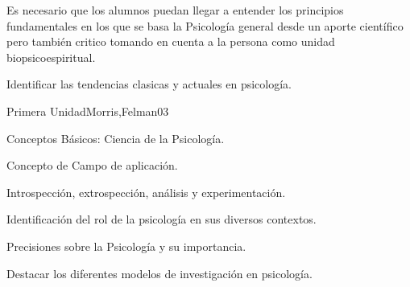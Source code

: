 \begin{syllabus}


\begin{justification}
Es necesario que los alumnos puedan llegar a entender los principios fundamentales en  los que se basa la Psicología general desde un aporte científico pero también critico tomando en cuenta a la persona como unidad biopsicoespiritual.
\end{justification}

\begin{goals}
\item Identificar las tendencias clasicas y actuales en psicología.
\end{goals}

\begin{outcomes}
\end{outcomes}

\begin{unit}{Primera Unidad}{Morris,Felman}{0}{3}
\begin{topics}
	\item Conceptos Básicos: Ciencia de la Psicología.
	\item Concepto de Campo de aplicación.
	\item Introspección, extrospección, análisis y experimentación.
\end{topics}
\begin{learningoutcomes}
	\item Identificación del rol de la psicología en sus diversos contextos.
	\item Precisiones sobre la Psicología y su importancia.
	\item Destacar los diferentes modelos de investigación en psicología.
\end{learningoutcomes}
\end{unit}


\end{syllabus}
